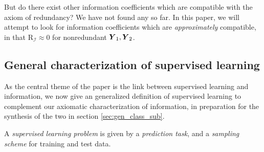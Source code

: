 \documentclass[12pt]{article}
\begin{document}
But do there exist other information coefficients which are compatible
with the axiom of redundancy?  We have not found any so far.  In this
paper, we will attempt to look for information coefficients which
are \emph{approximately} compatible, in that
$\text{R}_{\mathcal{I}} \approx 0$ for nonredundant $\boldsymbol{Y}_1, \boldsymbol{Y}_2$.

\subsection{General characterization of supervised learning}

As the central theme of the paper is the link between supervised
learning and information, we now give an generalized definition of
supervised learning to complement our axiomatic characterization of
information, in preparation for the synthesis of the two in
section \ref{sec:gen_class_sub}.

A \emph{supervised learning problem} is given by a \emph{prediction
task}, and a \emph{sampling scheme} for training and test data.
\end{document}
